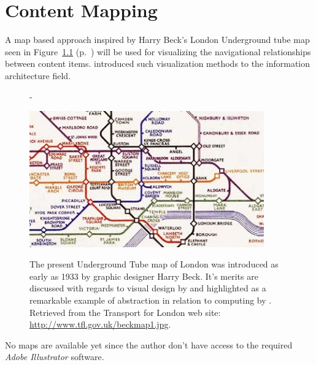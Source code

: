 \chapter{Content Mapping}

\label{appendix:content.mapping}

A map based approach inspired by Harry Beck's London Underground tube
map seen in Figure~\ref{figure:beck.1933.map}
(p.~\pageref{figure:beck.1933.map})
will be used for visualizing the navigational relationships between content
items. \citet{walsh07} introduced such visualization methods to the information
architecture field.

\begin{figure}[b]
  \begin{adjustwidth*}{0em}{-\wholemargin}
    \begin{center}
      \label{figure:beck.1933.map}
      \includegraphics[width=0.9\textwidth]{beck_1933_map}
      \caption[1933 London Underground Tube map]{%
        The present Underground Tube map of London was introduced as early as
        1933 by graphic designer Harry Beck. It's merits are discussed
        with regards to visual design by \citet{hadlaw03} and highlighted as
        a remarkable example of abstraction in relation to computing by
        \citet{kramer07}. Retrieved from the Transport for London web site:
        \url{http://www.tfl.gov.uk/beckmap1.jpg}.}
    \end{center}
  \end{adjustwidth*}
\end{figure}

No maps are available yet since the author don't have access to the required
\emph{Adobe Illustrator} software.
